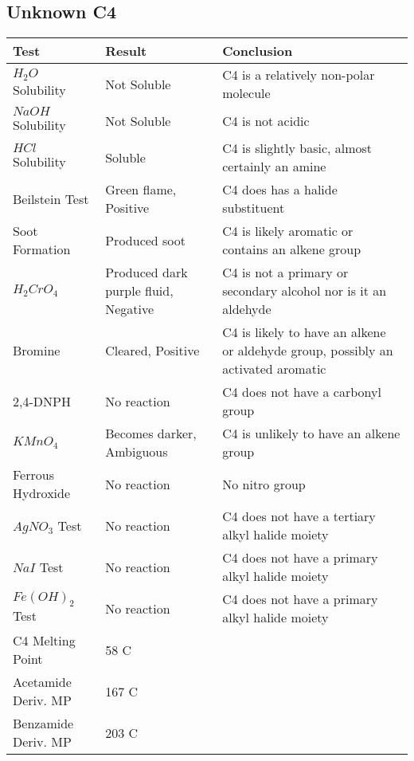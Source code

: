 \documentclass{article}
\begin{document}
	\subsection{Unknown C4}
	\begin{table}[h]
		\raggedright
		\begin{tabular}{ l  p{3.0cm} p{5.4cm} } 
			\toprule
			\textbf{Test} & \textbf{Result} & \textbf{Conclusion} \\\midrule
			
			$H_2O$ Solubility & Not Soluble & C4 is a relatively non-polar molecule \\\hline
			
			$NaOH$ Solubility & Not Soluble & C4 is not acidic \\\hline
			
			$HCl$ Solubility & Soluble & C4 is slightly basic, almost certainly an amine \\\hline
			
			Beilstein Test & Green flame, Positive & C4 does has a halide substituent \\\hline
			
			Soot Formation & Produced soot & C4 is likely aromatic or contains an alkene group \\\hline
			
			$H_2CrO_4$ & Produced dark purple fluid, Negative & C4 is not a primary or secondary alcohol nor is it an aldehyde \\\hline
			
			Bromine & Cleared, Positive & C4 is likely to have an alkene or aldehyde group, possibly an activated aromatic \\\hline 
			
			2,4-DNPH & No reaction & C4 does not have a carbonyl group \\\hline 
			
			$KMnO_4$ & Becomes darker, Ambiguous & C4 is unlikely to have an alkene group \\\hline  
			
			Ferrous Hydroxide & No reaction & No nitro group \\\hline
			
			$AgNO_3$ Test & No reaction & C4 does not have a tertiary alkyl halide moiety \\\hline 
			
			$NaI$ Test & No reaction & C4 does not have a primary alkyl halide moiety \\\hline 
			
			$Fe(OH)_2$ Test & No reaction & C4 does not have a primary alkyl halide moiety \\\hline
			
			C4 Melting Point & 58 C &  \\\hline
			
			Acetamide Deriv. MP & 167 C &  \\\hline
			
			Benzamide Deriv. MP & 203 C &  \\\hline
			
		\end{tabular}
	\end{table}
	\pagebreak
\end{document}
